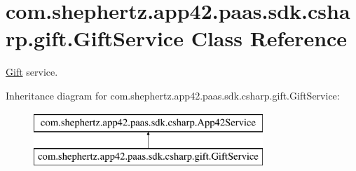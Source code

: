 \hypertarget{classcom_1_1shephertz_1_1app42_1_1paas_1_1sdk_1_1csharp_1_1gift_1_1_gift_service}{\section{com.\+shephertz.\+app42.\+paas.\+sdk.\+csharp.\+gift.\+Gift\+Service Class Reference}
\label{classcom_1_1shephertz_1_1app42_1_1paas_1_1sdk_1_1csharp_1_1gift_1_1_gift_service}
}


\hyperlink{classcom_1_1shephertz_1_1app42_1_1paas_1_1sdk_1_1csharp_1_1gift_1_1_gift}{Gift} service.  


Inheritance diagram for com.\+shephertz.\+app42.\+paas.\+sdk.\+csharp.\+gift.\+Gift\+Service\+:\begin{figure}[H]
\begin{center}
\leavevmode
\includegraphics[height=2.000000cm]{classcom_1_1shephertz_1_1app42_1_1paas_1_1sdk_1_1csharp_1_1gift_1_1_gift_service}
\end{center}
\end{figure}
